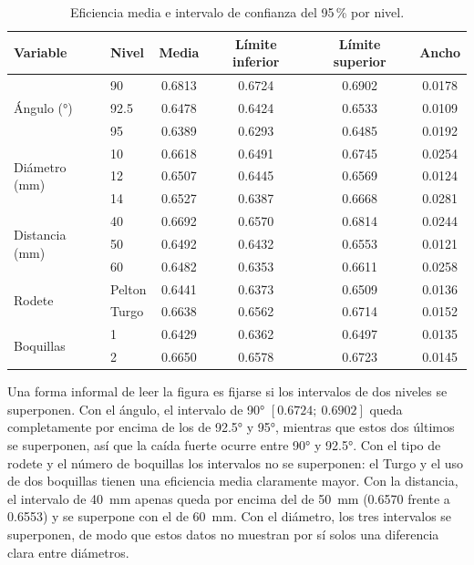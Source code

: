 \begin{table}[ht]
\centering
\caption{Eficiencia media e intervalo de confianza del 95\,\% por nivel.}
\label{tab:ic}
\begin{tabular}{llcccc}
\toprule
Variable & Nivel & Media & Límite inferior & Límite superior & Ancho \\
\midrule
\multirow{3}{*}{Ángulo (°)}     & 90     & 0.6813 & 0.6724 & 0.6902 & 0.0178 \\
                                & 92.5   & 0.6478 & 0.6424 & 0.6533 & 0.0109 \\
                                & 95     & 0.6389 & 0.6293 & 0.6485 & 0.0192 \\
\midrule
\multirow{3}{*}{Diámetro (mm)}  & 10     & 0.6618 & 0.6491 & 0.6745 & 0.0254 \\
                                & 12     & 0.6507 & 0.6445 & 0.6569 & 0.0124 \\
                                & 14     & 0.6527 & 0.6387 & 0.6668 & 0.0281 \\
\midrule
\multirow{3}{*}{Distancia (mm)} & 40     & 0.6692 & 0.6570 & 0.6814 & 0.0244 \\
                                & 50     & 0.6492 & 0.6432 & 0.6553 & 0.0121 \\
                                & 60     & 0.6482 & 0.6353 & 0.6611 & 0.0258 \\
\midrule
\multirow{2}{*}{Rodete}         & Pelton & 0.6441 & 0.6373 & 0.6509 & 0.0136 \\
                                & Turgo  & 0.6638 & 0.6562 & 0.6714 & 0.0152 \\
\midrule
\multirow{2}{*}{Boquillas}      & 1      & 0.6429 & 0.6362 & 0.6497 & 0.0135 \\
                                & 2      & 0.6650 & 0.6578 & 0.6723 & 0.0145 \\
\bottomrule
\end{tabular}
\end{table}

Una forma informal de leer la figura es fijarse si los intervalos de dos niveles se superponen. Con el ángulo, el intervalo de 90° $[0.6724;\ 0.6902]$ queda completamente por encima de los de 92.5° y 95°, mientras que estos dos últimos se superponen, así que la caída fuerte ocurre entre 90° y 92.5°. Con el tipo de rodete y el número de boquillas los intervalos no se superponen: el Turgo y el uso de dos boquillas tienen una eficiencia media claramente mayor. Con la distancia, el intervalo de 40~mm apenas queda por encima del de 50~mm (0.6570 frente a 0.6553) y se superpone con el de 60~mm. Con el diámetro, los tres intervalos se superponen, de modo que estos datos no muestran por sí solos una diferencia clara entre diámetros.

